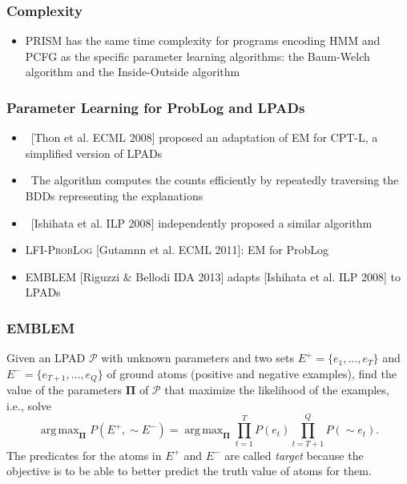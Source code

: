 \documentclass[trans,aspectratio=1610]{beamer}
\DeclareMathOperator*{\argmax}{arg\,max}
\newcommand{\lpnot}[1][\!\!]{\sim#1}
\begin{document}
\begin{frame}
  \frametitle{Complexity}
   \begin{itemize}
  \item PRISM has the same time complexity for programs encoding HMM and PCFG as the specific parameter learning
algorithms: the Baum-Welch
algorithm  and the Inside-Outside algorithm
  \end{itemize}
  \end{frame}
  \begin{frame}
\frametitle{Parameter Learning for ProbLog and LPADs}
\begin{itemize}
\item\ [Thon et al. ECML 2008] proposed an adaptation of EM for 
CPT-L, a simplified version of LPADs
\item\ The algorithm computes the counts efficiently by repeatedly traversing the BDDs representing the explanations
\item\ [Ishihata et al. ILP 2008] independently proposed a similar algorithm 
 \item \textsc{LFI-ProbLog} [Gutamnn et al. ECML 2011]: EM for ProbLog 
 \item EMBLEM [Riguzzi \& Bellodi IDA 2013] %
 adapts [Ishihata et al. ILP 2008]
to LPADs
\end{itemize}
\end{frame}

\begin{frame}
\frametitle{EMBLEM}
\begin{definition}
Given an LPAD $\mathcal{P}$ with unknown parameters and two sets $E^+=\{e_1,\ldots,e_T\}$ and  
$E^-=\{e_{T+1},\ldots,e_Q\}$
of ground atoms (positive and negative examples), find the value of the  parameters $\boldsymbol{\Pi}$ of  $\mathcal{P}$  that maximize the 
likelihood of the examples, i.e., solve
$$\argmax_{\boldsymbol{\Pi}}P(E^+,\lpnot E^-)=\argmax_{\boldsymbol{\Pi}}\prod_{t=1}^T P(e_t)\prod_{t=T+1}^Q P(\lpnot e_t).$$
 The predicates for the atoms in $E^+$ and $E^-$ 
are called \emph{target} because the objective is to be able to better predict the truth value of atoms
for them.
\end{definition}
\end{frame}
\end{document}
